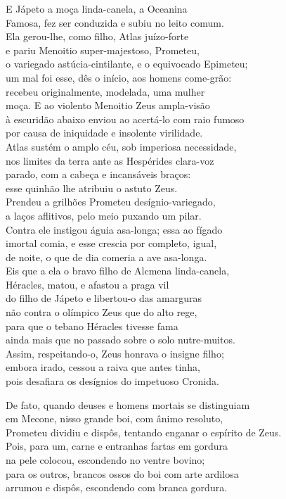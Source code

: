 \quad{}E Jápeto a moça linda-canela, a Oceanina\\
Famosa, fez ser conduzida e subiu no leito comum.\\
Ela gerou-lhe, como filho, Atlas juízo-forte\\
e pariu Menoitio super-majestoso, Prometeu, \\
o variegado astúcia-cintilante, e o equivocado Epimeteu;\\
um mal foi esse, dês o início, aos homens come-grão:\\
recebeu originalmente, modelada, uma mulher\\
moça. E ao violento Menoitio Zeus ampla-visão\\
à escuridão abaixo enviou ao acertá-lo com raio fumoso \\
por causa de iniquidade e insolente virilidade.\\
Atlas sustém o amplo céu, sob imperiosa necessidade,\\
nos limites da terra ante as Hespérides clara-voz\\
parado, com a cabeça e incansáveis braços:\\
esse quinhão lhe atribuiu o astuto Zeus. \\
Prendeu a grilhões Prometeu desígnio-variegado,\\
a laços aflitivos, pelo meio puxando um pilar.\\
Contra ele instigou águia asa-longa; essa ao fígado\\
imortal comia, e esse crescia por completo, igual,\\
de noite, o que de dia comeria a ave asa-longa. \\
Eis que a ela o bravo filho de Alcmena linda-canela,\\
Héracles, matou, e afastou a praga vil\\
do filho de Jápeto e libertou-o das amarguras\\
não contra o olímpico Zeus que do alto rege,\\
para que o tebano Héracles tivesse fama \\
ainda mais que no passado sobre o solo nutre-muitos.\\
Assim, respeitando-o, Zeus honrava o insigne filho;\\
embora irado, cessou a raiva que antes tinha,\\
pois desafiara os desígnios do impetuoso Cronida.

\quad{}De fato, quando deuses e homens mortais se distinguiam \\
em Mecone, nisso grande boi, com ânimo resoluto,\\
Prometeu dividiu e dispôs, tentando enganar o espírito de Zeus.\\
Pois, para um, carne e entranhas fartas em gordura\\
na pele colocou, escondendo no ventre bovino;\\
para os outros, brancos ossos do boi com arte ardilosa \\
arrumou e dispôs, escondendo com branca gordura.

